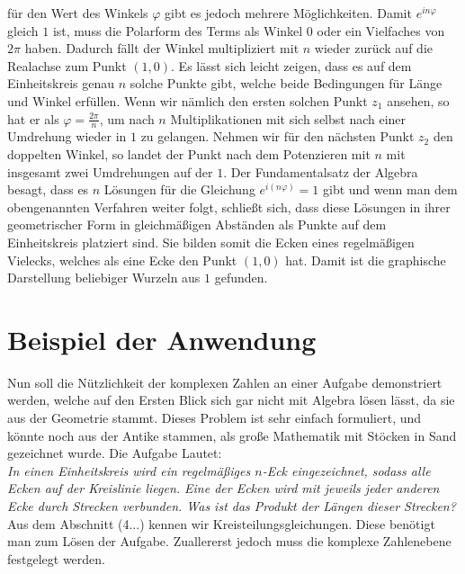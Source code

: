 \documentclass[a4paper,12pt]{article} %
\begin{document}
für den Wert des Winkels $\varphi$ gibt es jedoch mehrere Möglichkeiten.
Damit $e^{in\varphi}$ gleich $1$ ist, muss die Polarform des Terms als Winkel $0$ oder ein Vielfaches von $2\pi$ haben.
Dadurch fällt der Winkel multipliziert mit $n$ wieder zurück auf die Realachse zum Punkt $(1,0)$.
Es lässt sich leicht zeigen, dass es auf dem Einheitskreis genau $n$ solche Punkte gibt, welche beide Bedingungen für Länge und Winkel erfüllen.
Wenn wir nämlich den ersten solchen Punkt $z_1$ ansehen, so hat er als $\varphi=\frac{2\pi}{n}$, um nach $n$ Multiplikationen mit sich selbst nach einer Umdrehung wieder in $1$ zu gelangen.
Nehmen wir für den nächsten Punkt $z_2$ den doppelten Winkel, so landet der Punkt nach dem Potenzieren mit $n$ mit insgesamt zwei Umdrehungen auf der $1$.
Der Fundamentalsatz der Algebra besagt, dass es $n$ Lösungen für die Gleichung $e^{i(n\varphi)}=1$ gibt und wenn man dem obengenannten Verfahren weiter folgt, schließt sich, dass diese Lösungen in ihrer geometrischer Form in gleichmäßigen Abständen als Punkte auf dem Einheitskreis platziert sind.
Sie bilden somit die Ecken eines regelmäßigen Vielecks, welches als eine Ecke den Punkt $(1,0)$ hat.
Damit ist die graphische Darstellung beliebiger Wurzeln aus $1$ gefunden.





\section{Beispiel der Anwendung}

Nun soll die Nützlichkeit der komplexen Zahlen an einer Aufgabe demonstriert werden, welche auf den Ersten Blick sich gar nicht mit Algebra lösen lässt, da sie aus der Geometrie stammt. Dieses Problem ist sehr einfach formuliert, und könnte noch aus der Antike stammen, als große Mathematik mit Stöcken in Sand gezeichnet wurde. Die Aufgabe Lautet:\\

\noindent \textit{In einen Einheitskreis wird ein regelmäßiges $n$-Eck eingezeichnet, sodass alle Ecken auf der Kreislinie liegen.
Eine der Ecken wird mit jeweils jeder anderen Ecke durch Strecken verbunden.
Was ist das Produkt der Längen dieser Strecken?
}\\

Aus dem Abschnitt (4...) kennen wir Kreisteilungsgleichungen. Diese benötigt man zum Lösen der Aufgabe. Zuallererst jedoch muss die komplexe Zahlenebene festgelegt werden. 
\end{document}
